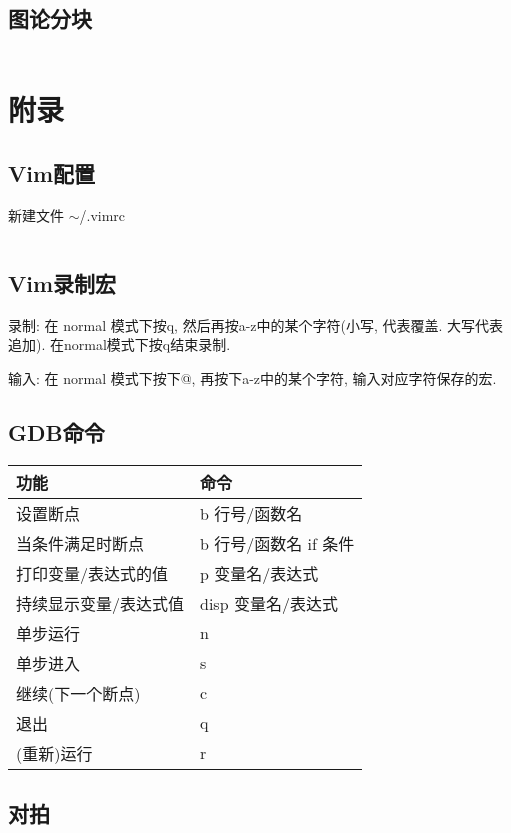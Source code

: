 \documentclass[utf8]{ctexart}
\newcommand{\cpp}[1]{\inputminted[linenos,breaklines,tabsize=4,mathescape]{c++}{#1}}
\begin{document}
\subsection{图论分块}
\cpp{codes/misc/graph-block.cpp}

\newpage

\section{附录}

\subsection{Vim配置}

新建文件 $\sim$/.vimrc

\inputminted[linenos,breaklines,tabsize=4,mathescape,texcl]{c}{codes/vimrc}

\subsection{Vim录制宏}

录制: 在 normal 模式下按q, 然后再按a-z中的某个字符(小写, 代表覆盖. 大写代表追加). 在normal模式下按q结束录制.

输入: 在 normal 模式下按下@, 再按下a-z中的某个字符, 输入对应字符保存的宏.

\subsection{GDB命令}

\begin{tabular}{ |l|l| }
	\hline
	\bfseries{功能}		& \bfseries{命令}		\\
	\hline
	设置断点				& b 行号/函数名			\\
	当条件满足时断点		& b 行号/函数名 if 条件	\\
	打印变量/表达式的值	& p 变量名/表达式			\\
	持续显示变量/表达式值	& disp 变量名/表达式		\\
	单步运行				& n						\\
	单步进入				& s						\\
	继续(下一个断点)		& c						\\
	退出					& q						\\
	(重新)运行			& r 					\\
	\hline
\end{tabular}

\subsection{对拍}
\end{document}
